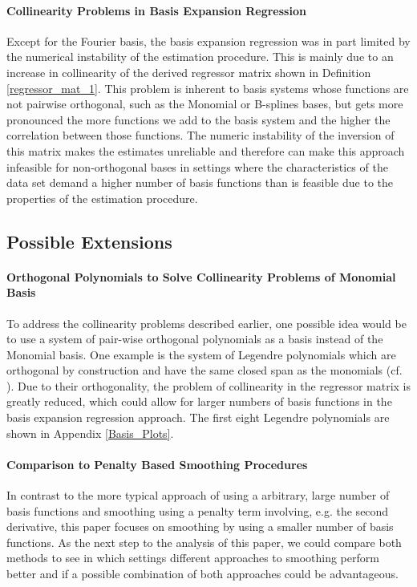 \documentclass[11pt,twoside,a4paper]{article}
\begin{document}
	\paragraph{Collinearity Problems in Basis Expansion Regression}
	Except for the Fourier basis, the basis expansion regression was in part limited by the numerical instability of the estimation procedure. This is mainly due to an increase in collinearity of the derived regressor matrix shown in Definition \ref{regressor_mat_1}. This problem is inherent to basis systems whose functions are not pairwise orthogonal, such as the Monomial or B-splines bases, but gets more pronounced the more functions we add to the basis system and the higher the correlation between those functions.
	The numeric instability of the inversion of this matrix makes the estimates unreliable and therefore can make this approach infeasible for non-orthogonal bases in settings where the characteristics of the data set demand a higher number of basis functions than is feasible due to the properties of the estimation procedure.
	\vspace{-0.2cm}
	
	\subsection*{Possible Extensions}
	
	\paragraph{Orthogonal Polynomials to Solve Collinearity Problems of Monomial Basis}
	To address the collinearity problems described earlier, one possible idea would be to use a system of pair-wise orthogonal polynomials as a basis instead of the Monomial basis. One example is the system of Legendre polynomials which are orthogonal by construction and have the same closed span as the monomials (cf. \cite{Dattoli_2001}). Due to their orthogonality, the problem of collinearity in the regressor matrix is greatly reduced, which could allow for larger numbers of basis functions in the basis expansion regression approach. The first eight Legendre polynomials are shown in Appendix \ref{Basis_Plots}.
	\vspace{-0.2cm}
	
	\paragraph{Comparison to Penalty Based Smoothing Procedures}
	In contrast to the more typical approach of using a arbitrary, large number of basis functions and smoothing using a penalty term involving, e.g. the second derivative, this paper focuses on smoothing by using a smaller number of basis functions. As the next step to the analysis of this paper, we could compare both methods to see in which settings different approaches to smoothing perform better and if a possible combination of both approaches could be advantageous.
	\vspace{-0.2cm}
	
\end{document}
